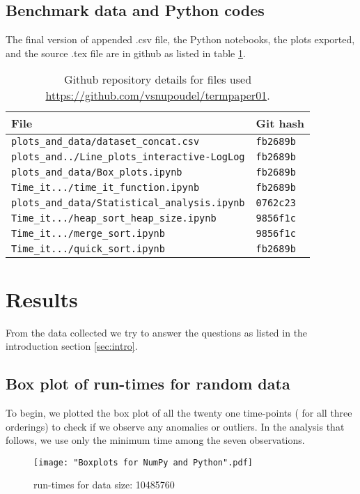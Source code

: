 \documentclass[sigconf, nonacm, natbib, screen, balance=False]{acmart}
\begin{document}
\subsection{Benchmark data and Python codes}\label{sec:githubfiles}
The final version of appended .csv file, the Python notebooks, the plots exported, and the source .tex file are in github as listed in table \ref{tab:hashes}.

\begin{table}[ht]
\caption{Github repository details for files used 
\url{https://github.com/vsnupoudel/termpaper01}.}
\label{tab:hashes}
\begin{tabular}{|l|l|}
\hline
File & Git hash 
\\\hline
\verb!plots_and_data/dataset_concat.csv! & \verb!fb2689b! \\
\verb!plots_and../Line_plots_interactive-LogLog! & \verb!fb2689b! \\
\verb!plots_and_data/Box_plots.ipynb! & \verb!fb2689b! \\
\verb!Time_it.../time_it_function.ipynb! & \verb!fb2689b! \\
\verb!plots_and_data/Statistical_analysis.ipynb! & \verb!0762c23! \\
\verb!Time_it.../heap_sort_heap_size.ipynb!	& \verb!9856f1c! \\
\verb!Time_it.../merge_sort.ipynb! & \verb!9856f1c! \\
\verb!Time_it.../quick_sort.ipynb! & \verb!fb2689b!  \\
\hline
\end{tabular}
\end{table}

\section{Results}\label{sec:results}
From the data collected we try to answer the questions as listed in the introduction section \ref{sec:intro}.

\subsection{Box plot of run-times for random data }\label{scatter}
To begin, we plotted the box plot of all the twenty one time-points ( for all three orderings) to check if we observe any anomalies or outliers. In the analysis that follows, we use only the minimum time among the seven observations.

\begin{figure}[ht]
\texttt{[image: "Boxplots for NumPy and Python".pdf]}
    \caption{run-times for data size: 10485760 }
    \label{fig:box1}
\end{figure}
\end{document}
